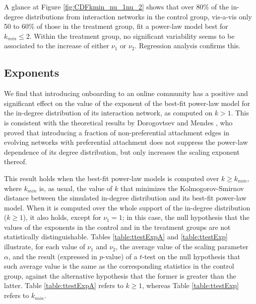 \documentclass{bmcart}
\def\texttt{[image: ]}
\begin{document}
%

A glance at Figure \ref{fig:CDFkmin_nu_1nu_2} shows that over 80\% of the in-degree distributions from interaction networks in the control group, vis-a-vis only 50 to 60\% of those in the treatment group, fit a power-law model best for $k_{min} \leq 2$. Within the treatment group, no significant variability seems to be associated to the increase of either $\nu_1$ or $\nu_2$. Regression analysis confirms this.

\subsection*{Exponents} \label{ssec:exponents}
We find that introducing onboarding to an online community has a positive and significant effect on the value of the exponent of the best-fit power-law model for the in-degree distribution of its interaction network, as computed on $k > 1$. This is consistent with the theoretical results by Dorogovtsev and Mendes \cite{dorogovtsev2002evolution}, who proved that introducing a fraction of non-preferential attachment edges in evolving networks with preferential attachment does not suppress the power-law dependence of its degree distribution, but only increases the scaling exponent thereof. 

This result holds when the best-fit power-law models is computed over $k \geq k_{min}$, where $k_{min}$ is, as usual, the value of $k$ that minimizes the Kolmogorov-Smirnov distance between the simulated in-degree distribution and its best-fit power-law model. When it is computed over the whole support of the in-degree distribution ($k \geq  1$), it also holds, except for $\nu_1 = 1$; in this case, the null hypothesis that the values of the exponents in the control and in the treatment groups are not statistically distinguishable. Tables \ref {table:ttestExpA} and \ref {table:ttestExp} illustrate, for each value of  $\nu_1$ and $\nu_2$, the average value of the scaling parameter $\alpha$, and the result (expressed in $p$-value) of a $t$-test on the null hypothesis that such average value is the same as the corresponding statistics in the control group, against the alternative hypothesis that the former is greater than the latter. Table \ref{table:ttestExpA} refers to $k \geq  1$, whereas Table \ref{table:ttestExp} refers to $k_{min}$.
\end{document}
